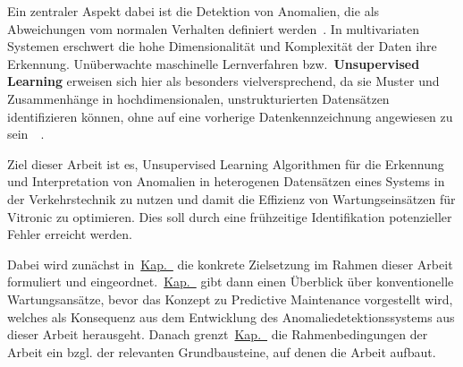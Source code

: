 Ein zentraler Aspekt dabei ist die Detektion von Anomalien, die als Abweichungen vom normalen Verhalten definiert
werden~\cite{Chandola2009}. In multivariaten Systemen erschwert die hohe Dimensionalität und Komplexität der Daten ihre Erkennung.
Unüberwachte maschinelle Lernverfahren bzw.~\textbf{Unsupervised Learning} erweisen sich hier als besonders vielversprechend,
da sie Muster und Zusammenhänge in hochdimensionalen, unstrukturierten Datensätzen identifizieren können, ohne auf eine vorherige
Datenkennzeichnung angewiesen zu sein~\cite{Chandola2009}~\cite[S.~22--24]{Wenig2024}.

Ziel dieser Arbeit ist es, Unsupervised Learning Algorithmen für die Erkennung und Interpretation von Anomalien in
heterogenen Datensätzen eines Systems in der Verkehrstechnik zu nutzen und damit die Effizienz von Wartungseinsätzen für
Vitronic zu optimieren. Dies soll durch eine frühzeitige Identifikation potenzieller Fehler erreicht werden.

Dabei wird zunächst in~\hyperref[ch:zielsetzung]{Kap.~} die konkrete Zielsetzung im Rahmen dieser Arbeit formuliert
und eingeordnet.~\hyperref[ch:pdm_theorie]{Kap.~} gibt dann einen Überblick über konventionelle Wartungsansätze,
bevor das Konzept zu Predictive Maintenance vorgestellt wird, welches als Konsequenz aus dem Entwicklung des Anomaliedetektionssystems
aus dieser Arbeit herausgeht. Danach grenzt~\hyperref[ch:framework]{Kap.~} die Rahmenbedingungen der Arbeit ein bzgl.
der relevanten Grundbausteine, auf denen die Arbeit aufbaut.
